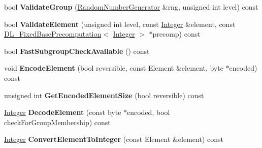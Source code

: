\begin{DoxyCompactItemize}
\item 
\hypertarget{class_d_l___group_parameters___integer_based_aa329e6578616677a868dacfb605b0ae2}{
bool {\bfseries ValidateGroup} (\hyperlink{class_random_number_generator}{RandomNumberGenerator} \&rng, unsigned int level) const }
\label{class_d_l___group_parameters___integer_based_aa329e6578616677a868dacfb605b0ae2}

\item 
\hypertarget{class_d_l___group_parameters___integer_based_a2a2e97fbd1ddf713841ea9825e2b1c90}{
bool {\bfseries ValidateElement} (unsigned int level, const \hyperlink{class_integer}{Integer} \&element, const \hyperlink{class_d_l___fixed_base_precomputation}{DL\_\-FixedBasePrecomputation}$<$ \hyperlink{class_integer}{Integer} $>$ $\ast$precomp) const }
\label{class_d_l___group_parameters___integer_based_a2a2e97fbd1ddf713841ea9825e2b1c90}

\item 
\hypertarget{class_d_l___group_parameters___integer_based_adf97194735312199267db1de95ab41fd}{
bool {\bfseries FastSubgroupCheckAvailable} () const }
\label{class_d_l___group_parameters___integer_based_adf97194735312199267db1de95ab41fd}

\item 
\hypertarget{class_d_l___group_parameters___integer_based_a9ceb27f7c51beae7116052ab6358d5e3}{
void {\bfseries EncodeElement} (bool reversible, const Element \&element, byte $\ast$encoded) const }
\label{class_d_l___group_parameters___integer_based_a9ceb27f7c51beae7116052ab6358d5e3}

\item 
\hypertarget{class_d_l___group_parameters___integer_based_a9786b983ff7cd1f2152ebf8f319b777d}{
unsigned int {\bfseries GetEncodedElementSize} (bool reversible) const }
\label{class_d_l___group_parameters___integer_based_a9786b983ff7cd1f2152ebf8f319b777d}

\item 
\hypertarget{class_d_l___group_parameters___integer_based_a97a70418722f760768328239f569cfef}{
\hyperlink{class_integer}{Integer} {\bfseries DecodeElement} (const byte $\ast$encoded, bool checkForGroupMembership) const }
\label{class_d_l___group_parameters___integer_based_a97a70418722f760768328239f569cfef}

\item 
\hypertarget{class_d_l___group_parameters___integer_based_a49f95d1c429bb4eda7b7ce59c9ac8289}{
\hyperlink{class_integer}{Integer} {\bfseries ConvertElementToInteger} (const Element \&element) const }
\label{class_d_l___group_parameters___integer_based_a49f95d1c429bb4eda7b7ce59c9ac8289}


\end{DoxyCompactItemize}
